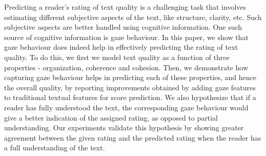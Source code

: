 Predicting a reader's rating of text quality is a challenging task that involves estimating different subjective aspects of the text, like structure, clarity, etc. Such subjective aspects are better handled using cognitive information. One such source of cognitive information is gaze behaviour. In this paper, we show that gaze behaviour does indeed help in effectively predicting the rating of text quality. To do this, we first we model text quality as a function of three properties - organization, coherence and cohesion. Then, we demonstrate how capturing gaze behaviour helps in predicting each of these properties, and hence the overall quality, by reporting improvements obtained by adding gaze features to traditional textual features for score prediction. We also hypothesize that if a reader has fully understood the text, the corresponding gaze behaviour would give a better indication of the assigned rating, as opposed to partial understanding. Our experiments validate this hypothesis by showing greater agreement between the given rating and the predicted rating when the reader has a full understanding of the text.
